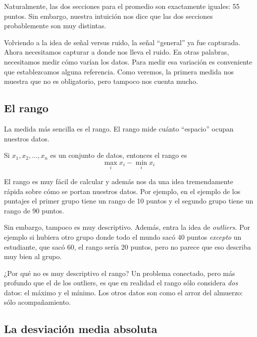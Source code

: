 Naturalmente, las dos secciones para el promedio son exactamente iguales: 55 puntos. Sin embargo, nuestra intuición nos dice que las dos secciones probablemente son muy distintas. 

Volviendo a la idea de señal versus ruido, la señal \enquote{general} ya fue capturada. Ahora necesitamos capturar a donde nos lleva el ruido. En otras palabras, necesitamos medir cómo varían los datos. Para medir esa variación es conveniente que establezcamos alguna referencia. Como veremos, la primera medida nos muestra que no es obligatorio, pero tampoco nos cuenta mucho.


\subsection{El rango}

La medida más sencilla es el rango. El rango mide cuánto \enquote{espacio} ocupan nuestros datos.

\formal
\begin{definition}[Rango]
Si \(x_1, x_2, \ldots, x_n\) es un conjunto de datos, entonces el rango es \[\max_i x_i - \min_i x_i\]
\end{definition}
\informal

El rango es muy fácil de calcular y además nos da una idea tremendamente rápida sobre cómo se portan nuestros datos. Por ejemplo, en el ejemplo de los puntajes el primer grupo tiene un rango de 10 puntos y el segundo grupo tiene un rango de 90 puntos.

Sin embargo, tampoco es muy descriptivo. Además, entra la idea de \emph{outliers.} Por ejemplo si hubiera otro grupo donde todo el mundo sacó 40 puntos \emph{excepto} un estudiante, que sacó 60, el rango sería 20 puntos, pero no parece que eso describa muy bien al grupo.

¿Por qué no es muy descriptivo el rango? Un problema conectado, pero más profundo que el de los outliers, es que en realidad el rango sólo considera \emph{dos} datos: el máximo y el mínimo. Los otros datos son como el arroz del almuerzo: sólo acompañamiento.


\subsection{La desviación media absoluta}


